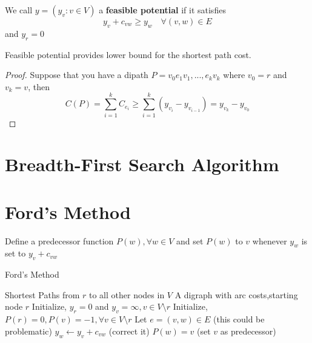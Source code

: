 			\begin{definition}
				We call $y = (y_v: v\in V)$ a \textbf{feasible potential} if it satisfies
				\begin{equation}
					y_v + c_{vw} \ge y_w \quad \forall (v, w) \in E
				\end{equation}
				and $y_r = 0$
			\end{definition}

			\begin{proposition}
				Feasible potential provides lower bound for the shortest path cost.
			\end{proposition}

			\begin{proof}
				Suppose that you have a dipath $P = v_0e_1v_1,...,e_kv_k$ where $v_0 = r$ and $v_k = v$, then
				\begin{equation}
					C(P) = \sum_{i=1}^k C_{e_i} \ge \sum_{i=1}^k(y_{v_i} - y_{v_{i-1}}) = y_{v_k} - y_{v_0}
				\end{equation}
			\end{proof}

		\section{Breadth-First Search Algorithm}

		\section{Ford's Method}
			Define a predecessor function $P(w), \forall w \in V$ and set $P(w)$ to $v$ whenever $y_w$ is set to $y_v + c_{vw}$

			\begin{algorithm}
				\caption{Ford's Method}
				\begin{algorithmic}
					\Ensure Shortest Paths from $r$ to all other nodes in $V$
					\Require A digraph with arc costs,starting node $r$
					\State Initialize, $y_r = 0$ and $y_v = \infty, v\in V\setminus r$
					\State Initialize, $P(r) = 0, P(v) = -1, \forall v \in V \setminus r$
						\State Let $e = (v, w)\in E$ (this could be problematic)
							\State $y_w \gets y_v + c_{vw}$ (correct it)
							\State $P(w) = v$ (set $v$ as predecessor)
						\EndIf
					\EndWhile
				\end{algorithmic}
			\end{algorithm}

